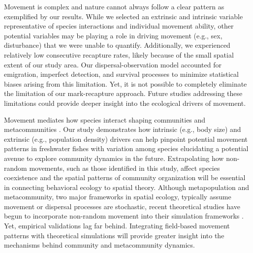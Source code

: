 \documentclass[11pt, class=article, crop=false]{standalone}
\begin{document}
Movement is complex and nature cannot always follow a clear pattern as exemplified by our results. While we selected an extrinsic and intrinsic variable representative of species interactions and individual movement ability, other potential variables may be playing a role in driving movement (e.g., sex, disturbance) that we were unable to quantify. Additionally, we experienced relatively low consecutive recapture rates, likely because of the small spatial extent of our study area. Our dispersal-observation model accounted for emigration, imperfect detection, and survival processes to minimize statistical biases arising from this limitation. Yet, it is not possible to completely eliminate the limitation of our mark-recapture approach. Future studies addressing these limitations could provide deeper insight into the ecological drivers of movement.

Movement mediates how species interact shaping communities and metacommunities \citep{schlagelMovementmediatedCommunityAssembly2020}. Our study demonstrates how intrinsic (e.g., body size) and extrinsic (e.g., population density) drivers can help pinpoint potential movement patterns in freshwater fishes with variation among species elucidating a potential avenue to explore community dynamics in the future. Extrapolating how non-random movements, such as those identified in this study, affect species coexistence and the spatial patterns of community organization will be essential in connecting behavioral ecology to spatial theory. Although metapopulation and metacommunity, two major frameworks in spatial ecology, typically assume movement or dispersal processes are stochastic, recent theoretical studies have begun to incorporate non-random movement into their simulation frameworks \citep{amarasekareEffectNonrandomDispersal2010, ruokolainenStableCoexistenceEcologically2016}. Yet, empirical validations lag far behind. Integrating field-based movement patterns with theoretical simulations will provide greater insight into the mechanisms behind community and metacommunity dynamics.



\end{document}
